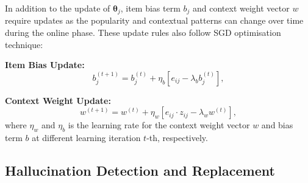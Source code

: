 \documentclass[acmsmall]{acmart}
\begin{document}
In addition to the update of $\boldsymbol{\theta}_j$, item bias term $b_j$ and context weight vector $w$ require updates as the popularity and contextual patterns can change over time during the online phase. These update rules also follow SGD optimisation technique: 


\textbf{Item Bias Update:}
\begin{equation}
b_j^{(t+1)} = b_j^{(t)} + \eta_b \left[e_{ij} - \lambda_b b_j^{(t)}\right],
\end{equation}

\textbf{Context Weight Update:}
\begin{equation}
w^{(t+1)} = w^{(t)} + \eta_w \left[e_{ij} \cdot z_{ij} - \lambda_w w^{(t)}\right],
\end{equation}
where $\eta_w$ and $\eta_b$ is the learning rate for the context weight vector $w$ and bias term $b$ at different learning iteration $t$-th, respectively.

\subsection{Hallucination Detection and Replacement}
\label{sec:hallucination_mitigation}
\end{document}
